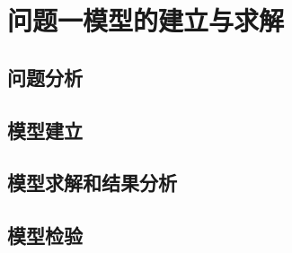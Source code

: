 \documentclass[withoutpreface,bwprint]{cumcmthesis}
\begin{document}
\section{问题一模型的建立与求解}

\subsection{问题分析}

\subsection{模型建立}

\subsection {模型求解和结果分析}

\subsection{模型检验}

\end{document}
